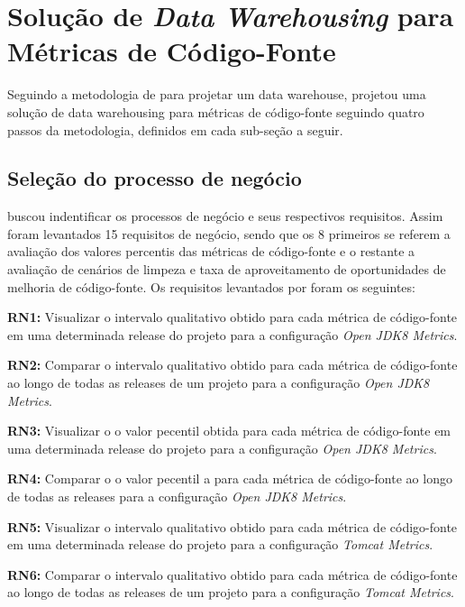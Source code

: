 \section{Solução de \textit{Data Warehousing} para Métricas de Código-Fonte}

Seguindo a metodologia de  para projetar um data warehouse,  projetou uma solução de data warehousing para métricas de código-fonte seguindo quatro passos da metodologia, definidos em cada sub-seção a seguir.


\subsection{Seleção do processo de negócio}

 buscou indentificar os processos de negócio e seus respectivos requisitos. Assim foram levantados 15 requisitos de negócio, sendo que os 8 primeiros se referem a avaliação dos valores percentis das métricas de código-fonte e o restante a avaliação de cenários de limpeza e taxa de aproveitamento de oportunidades de melhoria de código-fonte. Os requisitos levantados por  foram os seguintes:

\textbf{RN1:}  Visualizar o intervalo qualitativo obtido para cada métrica de código-fonte em uma determinada release do projeto para a configuração \textit{Open JDK8 Metrics}.

\textbf{RN2:}  Comparar o intervalo qualitativo obtido para cada métrica de código-fonte ao longo de todas as releases de um projeto para a configuração \textit{Open JDK8 Metrics}.

\textbf{RN3:}  Visualizar o o valor pecentil obtida para cada métrica de código-fonte em uma determinada release do projeto para a configuração  \textit{Open JDK8 Metrics}.

\textbf{RN4:}  Comparar o o valor pecentil a para cada métrica de código-fonte ao longo de todas as releases para a configuração \textit{Open JDK8 Metrics}.

\textbf{RN5:}  Visualizar o intervalo qualitativo obtido para cada métrica de código-fonte em uma determinada release do projeto para a configuração \textit{Tomcat Metrics}.

\textbf{RN6:}  Comparar o intervalo qualitativo obtido para cada métrica de código-fonte ao longo de todas as releases de um projeto para a configuração \textit{Tomcat Metrics}.

